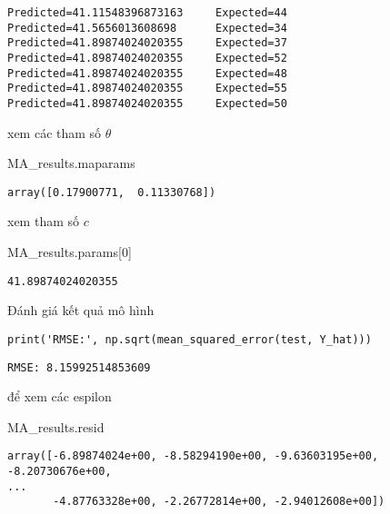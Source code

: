 \documentclass[
]{book}
\newenvironment{Shaded}{\begin{snugshade}}{\end{snugshade}}
\newcommand{\DecValTok}[1]{\textcolor[rgb]{0.00,0.00,0.81}{#1}}
\newcommand{\NormalTok}[1]{#1}
\begin{document}
\begin{verbatim}
Predicted=41.11548396873163     Expected=44
Predicted=41.5656013608698      Expected=34
Predicted=41.89874024020355     Expected=37
Predicted=41.89874024020355     Expected=52
Predicted=41.89874024020355     Expected=48
Predicted=41.89874024020355     Expected=55
Predicted=41.89874024020355     Expected=50
\end{verbatim}

xem các tham số \(\theta\)

\begin{Shaded}
\begin{Highlighting}[]
\NormalTok{MA\_results.maparams}
\end{Highlighting}
\end{Shaded}

\begin{verbatim}
array([0.17900771,  0.11330768])
\end{verbatim}

xem tham số \(c\)

\begin{Shaded}
\begin{Highlighting}[]
\NormalTok{MA\_results.params[}\DecValTok{0}\NormalTok{]}
\end{Highlighting}
\end{Shaded}

\begin{verbatim}
41.89874024020355
\end{verbatim}

Đánh giá kết quả mô hình

\begin{verbatim}
print('RMSE:', np.sqrt(mean_squared_error(test, Y_hat)))
\end{verbatim}

\begin{verbatim}
RMSE: 8.15992514853609
\end{verbatim}

để xem các espilon

\begin{Shaded}
\begin{Highlighting}[]
\NormalTok{MA\_results.resid}
\end{Highlighting}
\end{Shaded}

\begin{verbatim}
array([-6.89874024e+00, -8.58294190e+00, -9.63603195e+00, -8.20730676e+00,
...
       -4.87763328e+00, -2.26772814e+00, -2.94012608e+00])
\end{verbatim}
\end{document}
